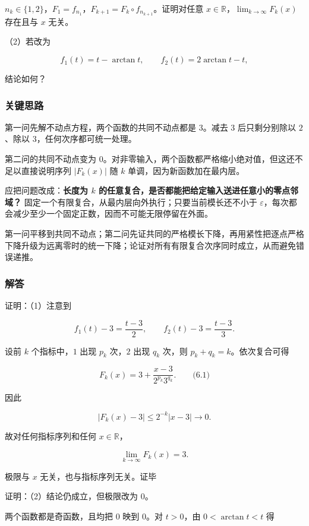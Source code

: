 \documentclass[11pt,a4paper]{article}
\begin{document}
\(n_k\in\{1,2\}\)，\(F_1=f_{n_1}\)，\(F_{k+1}=F_k\circ f_{n_{k+1}}\)。证明对任意
\(x\in\mathbb R\)，\(\lim_{k\to\infty}F_k(x)\) 存在且与 \(x\) 无关。

（2）若改为

\[
f_1(t)=t-\arctan t,\qquad
f_2(t)=2\arctan t-t,
\]

结论如何？

\subsubsection{关键思路}\label{ux5173ux952eux601dux8def-21}

第一问先解不动点方程，两个函数的共同不动点都是 \(3\)。减去 \(3\)
后只剩分别除以 \(2\)、除以 \(3\)，任何次序都可统一处理。

第二问的共同不动点变为
\(0\)。对非零输入，两个函数都严格缩小绝对值，但这还不足以直接说明序列
\(|F_k(x)|\) 随 \(k\) 单调，因为新函数加在最内层。

应把问题改成：\textbf{长度为 \(k\)
的任意复合，是否都能把给定输入送进任意小的零点邻域？}
固定一个有限复合，从最内层向外执行；只要当前模长还不小于
\(\varepsilon\)，每次都会减少至少一个固定正数，因而不可能无限停留在外面。

第一问平移到共同不动点；第二问先证共同的严格模长下降，再用紧性把逐点严格下降升级为远离零时的统一下降；论证对所有有限复合次序同时成立，从而避免错误递推。

\subsubsection{解答}\label{ux89e3ux7b54-21}

证明：（1）注意到

\[
f_1(t)-3=\frac{t-3}{2},\qquad
f_2(t)-3=\frac{t-3}{3}.
\]

设前 \(k\) 个指标中，\(1\) 出现 \(p_k\) 次，\(2\) 出现 \(q_k\) 次，则
\(p_k+q_k=k\)。依次复合可得

\[
F_k(x)=3+\frac{x-3}{2^{p_k}3^{q_k}}.
\qquad\text{(6.1)}
\]

因此

\[
|F_k(x)-3|\le2^{-k}|x-3|\longrightarrow0.
\]

故对任何指标序列和任何 \(x\in\mathbb R\)，

\[
\boxed{\lim_{k\to\infty}F_k(x)=3}.
\]

极限与 \(x\) 无关，也与指标序列无关。证毕

证明：（2）结论仍成立，但极限改为 \(0\)。

两个函数都是奇函数，且均把 \(0\) 映到 \(0\)。对 \(t>0\)，由
\(0<\arctan t<t\) 得
\end{document}
